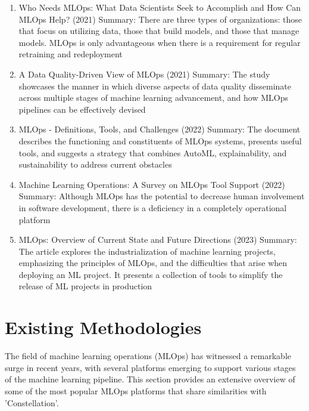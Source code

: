 \documentclass[12pt,a4paper]{report}     %
\begin{document}
\begin{normalsize}
{\begin{enumerate}
\item Who Needs MLOps: What Data Scientists Seek to Accomplish and How Can MLOps Help? (2021)
\newline Summary: There are three types of organizations: those that focus on utilizing data, those that build models, and those that manage models. MLOps is only advantageous when there is a requirement for regular retraining and redeployment

\item A Data Quality-Driven View of MLOps (2021)
\newline Summary: The study showcases the manner in which diverse aspects of data quality disseminate across multiple stages of machine learning advancement, and how MLOps pipelines can be effectively devised

\item MLOps - Definitions, Tools, and Challenges (2022)
\newline Summary: The document describes the functioning and constituents of MLOps systems, presents useful tools, and suggests a strategy that combines AutoML, explainability, and sustainability to address current obstacles

\item Machine Learning Operations: A Survey on MLOps Tool Support (2022)
\newline Summary: Although MLOps has the potential to decrease human involvement in software development, there is a deficiency in a completely operational platform

\item MLOps: Overview of Current State and Future Directions (2023)
\newline Summary: The article explores the industrialization of machine learning projects, emphasizing the principles of MLOps, and the difficulties that arise when deploying an ML project. It presents a collection of tools to simplify the release of ML projects in production
\end{enumerate}

\section{Existing Methodologies}
The field of machine learning operations (MLOps) has witnessed a remarkable surge in recent years, with several platforms emerging to support various stages of the machine learning pipeline. This section provides an extensive overview of some of the most popular MLOps platforms that share similarities with 'Constellation'.
}
\end{normalsize}
\end{document}
